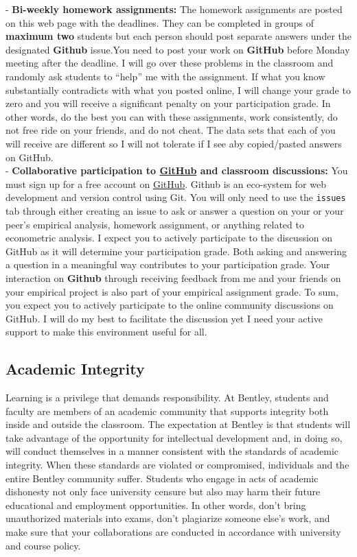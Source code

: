 \documentclass[
]{book}
\begin{document}
\begin{itemize}
  - \textbf{Bi-weekly homework assignments:} The homework assignments are posted on this web page with the deadlines. They can be completed in groups of \textbf{maximum two} students but each person should post separate answers under the designated \textbf{Github} issue.You need to post your work on \textbf{GitHub} before Monday meeting after the deadline. I will go over these problems in the classroom and randomly ask students to ``help'' me with the assignment. If what you know substantially contradicts with what you posted online, I will change your grade to zero and you will receive a significant penalty on your participation grade. In other words, do the best you can with these assignments, work consistently, do not free ride on your friends, and do not cheat. The data sets that each of you will receive are different so I will not tolerate if I see aby copied/pasted answers on GitHub.\\
  - \textbf{Collaborative participation to \href{https://github.com/}{GitHub} and classroom discussions:} You must sign up for a free account on \href{https://github.com/}{GitHub}. Github is an eco-system for web development and version control using Git. You will only need to use the \texttt{issues} tab through either creating an issue to ask or answer a question on your or your peer's empirical analysis, homework assignment, or anything related to econometric analysis. I expect you to actively participate to the discussion on GitHub as it will determine your participation grade. Both asking and answering a question in a meaningful way contributes to your participation grade. Your interaction on \textbf{Github} through receiving feedback from me and your friends on your empirical project is also part of your empirical assignment grade. To sum, you expect you to actively participate to the online community discussions on GitHub. I will do my best to facilitate the discussion yet I need your active support to make this environment useful for all.
\end{itemize}

\hypertarget{academic-integrity}{%
\subsection*{Academic Integrity}\label{academic-integrity}}

Learning is a privilege that demands responsibility. At Bentley, students and faculty are members of an academic community that supports integrity both inside and outside the classroom. The expectation at Bentley is that students will take advantage of the opportunity for intellectual development and, in doing so, will conduct themselves in a manner consistent with the standards of academic integrity. When these standards are violated or compromised, individuals and the entire Bentley community suffer. Students who engage in acts of academic dishonesty not only face university censure but also may harm their future educational and employment opportunities. In other words, don't bring unauthorized materials into exams, don't plagiarize someone else's work, and make sure that your collaborations are conducted in accordance with university and course policy.
\end{document}
